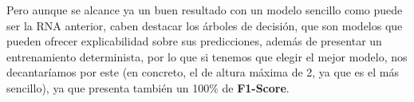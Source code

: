 \documentclass[12pt]{article}
\begin{document}
\begin{table}[!ht]
	\centering
	
	\caption{Matriz de confusión RNA}
	\label{tab:confusion_matrix_1}
\end{table}

\newpage
Pero aunque se alcance ya un buen resultado con un modelo sencillo como puede ser la RNA anterior, caben destacar los árboles de decisión,
que son modelos que pueden ofrecer explicabilidad sobre sus predicciones, además de presentar un entrenamiento determinista, por lo que 
si tenemos que elegir el mejor modelo, nos decantaríamos por este (en concreto, el de altura máxima de 2, ya que es el más sencillo), 
ya que presenta también un 100\% de \textbf{F1-Score}.
\end{document}

